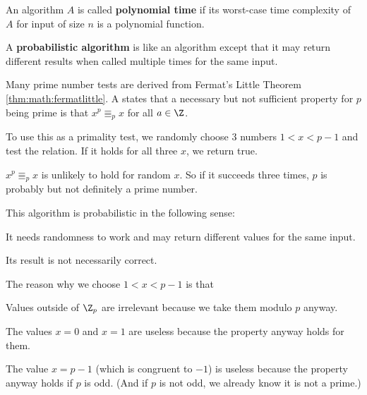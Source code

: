 \begin{definition}
 An algorithm $A$ is called \textbf{polynomial time} if its worst-case time complexity of $A$ for input of size $n$ is a polynomial function.
\end{definition}

\begin{definition}
 A \textbf{probabilistic algorithm} is like an algorithm except that it may return different results when called multiple times for the same input.
\end{definition}

\begin{example}
Many prime number tests are derived from Fermat's Little Theorem \ref{thm:math:fermatlittle}.
A states that a necessary but not sufficient property for $p$ being prime is that $x^p\Equiv_p x$ for all $a\in \Z$.

To use this as a primality test, we randomly choose $3$ numbers $1<x<p-1$ and test the relation.
If it holds for all three $x$, we return true.

$x^p\Equiv_p x$ is unlikely to hold for random $x$.
So if it succeeds three times, $p$ is probably but not definitely a prime number.

This algorithm is probabilistic in the following sense:
\begin{compactitem}
 \item It needs randomness to work and may return different values for the same input.
 \item Its result is not necessarily correct.
\end{compactitem}

The reason why we choose $1<x<p-1$ is that
\begin{compactitem}
 \item Values outside of $\Z_p$ are irrelevant because we take them modulo $p$ anyway.
 \item The values $x=0$ and $x=1$ are useless because the property anyway holds for them.
 \item The value $x=p-1$ (which is congruent to $-1$) is useless because the property anyway holds if $p$ is odd. (And if $p$ is not odd, we already know it is not a prime.)
\end{compactitem}
\end{example}

